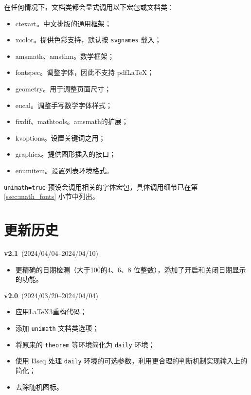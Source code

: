 \documentclass{SYSUDaily}
\begin{document}
在任何情况下，文档类都会显式调用以下宏包或文档类：
\begin{itemize}[parsep=0pt,itemsep=0pt]
	\item
			\textsf{ctexart}。中文排版的通用框架；
	\item
			\textsf{xcolor}。提供色彩支持，默认按 \verb|svgnames| 载入；
	\item
			\textsf{amsmath}、\textsf{amsthm}。数学框架；
	\item
			\textsf{fontspec}。调整字体，因此不支持 pdf\LaTeX{}；
	\item
			\textsf{geometry}。用于调整页面尺寸；
	\item
			\textsf{eucal}。调整手写数学字体样式；
	\item
			\textsf{fixdif}、\textsf{mathtools}。\textsf{amsmath}的扩展；
	\item
			\textsf{kvoptions}。设置关键词之用；
	\item
			\textsf{graphicx}。提供图形插入的接口；
	\item
			\textsf{enumitem}。设置列表环境格式。
\end{itemize}
\verb|unimath=true| 预设会调用相关的字体宏包，具体调用细节已在第 \ref{ssec:math_fonts} 小节中列出。

\section{更新历史}
\begin{flushleft}
	\footnotesize
	\textbf{v2.1}~(2024/04/04--2024/04/10)
	\begin{itemize}[parsep=0pt,itemsep=0pt]
		\item
				更精确的日期检测（大于100的4、6、8 位整数），添加了开启和关闭日期显示的功能。
	\end{itemize}
  
	\textbf{v2.0}~(2024/03/20--2024/04/04)
	\begin{itemize}[parsep=0pt,itemsep=0pt]
		\item
				应用\LaTeX{3}重构代码；
		\item
				添加 \verb|unimath| 文档类选项；
		\item
				将原来的 \verb|theorem| 等环境简化为 \verb|daily| 环境；
		\item
				使用 \textsf{l3seq} 处理 \verb|daily| 环境的可选参数，利用更合理的判断机制实现输入上的简化；
		\item
				去除随机图标。
	\end{itemize}
\end{flushleft}
\end{document}
